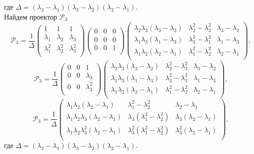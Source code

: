 где $\Delta = (\lambda_3-\lambda_1)(\lambda_3-\lambda_2)(\lambda_2-\lambda_1).$ \\
Найдем проектор $\mathcal{P}_3$
$$
\mathcal{P}_3 = 
\frac{1}{\Delta}
\begin{pmatrix}
  	1 & 1 & 1\\
  	\lambda_1 & \lambda_2 & \lambda_3 \\
  	\lambda_1^2 & \lambda_2^2 & \lambda_3^2 \\
 \end{pmatrix}
\begin{pmatrix}
  	0 & 0 & 0\\
  	0 & 0 & 0\\
  	0 & 0 & 1 \\
 \end{pmatrix}
\begin{pmatrix}
  	\lambda_2\lambda_3(\lambda_3-\lambda_2) & \lambda_2^2-\lambda_3^2 & \lambda_3-\lambda_2\\
  	\lambda_1\lambda_3(\lambda_1-\lambda_3) & \lambda_3^2-\lambda_1^2 & \lambda_1-\lambda_3\\
  	\lambda_1\lambda_2(\lambda_2-\lambda_1) & \lambda_1^2-\lambda_2^2 & \lambda_2-\lambda_1\\
 \end{pmatrix},
$$
$$
\mathcal{P}_3 = 
\frac{1}{\Delta}
\begin{pmatrix}
  	0 & 0 & 1\\
  	0 & 0 & \lambda_3 \\
  	0 & 0 & \lambda_3^2 \\
 \end{pmatrix}
\begin{pmatrix}
  	\lambda_2\lambda_3(\lambda_3-\lambda_2) & \lambda_2^2-\lambda_3^2 & \lambda_3-\lambda_2\\
  	\lambda_1\lambda_3(\lambda_1-\lambda_3) & \lambda_3^2-\lambda_1^2 & \lambda_1-\lambda_3\\
  	\lambda_1\lambda_2(\lambda_2-\lambda_1) & \lambda_1^2-\lambda_2^2 & \lambda_2-\lambda_1\\
 \end{pmatrix},
$$
$$
\mathcal{P}_3 = 
\frac{1}{\Delta}
\begin{pmatrix}
  	\lambda_1\lambda_2(\lambda_2-\lambda_1) & \lambda_1^2-\lambda_2^2 & \lambda_2-\lambda_1\\
  	\lambda_1\lambda_2\lambda_3(\lambda_2-\lambda_1) & \lambda_3(\lambda_1^2-\lambda_2^2) & \lambda_3(\lambda_2-\lambda_1)\\
  	\lambda_1\lambda_2\lambda_3^2(\lambda_2-\lambda_1) & \lambda_3^2(\lambda_1^2-\lambda_2^2) & \lambda_3^2(\lambda_2-\lambda_1)\\
 \end{pmatrix},
$$
где $\Delta = (\lambda_3-\lambda_1)(\lambda_3-\lambda_2)(\lambda_2-\lambda_1).$

